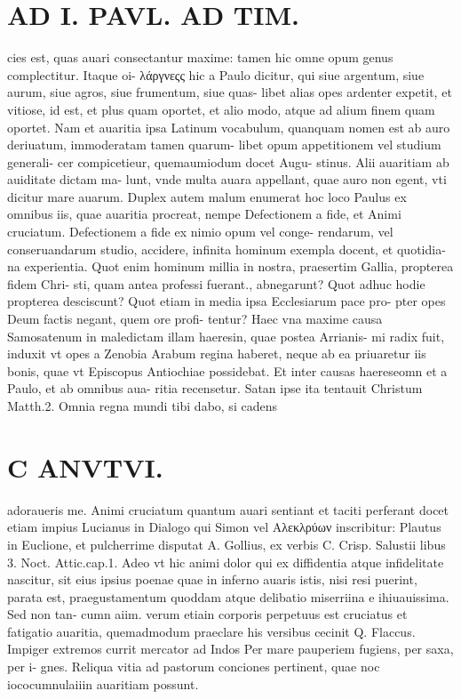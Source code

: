 \documentclass{article}
\begin{document}
\begin{pages}
\section*{AD I. PAVL. AD TIM. }
\marginpar{[ p.40 ]}\pstart cies est, quas auari consectantur maxime: tamen hic omne opum genus complectitur. Itaque oi- λάργνεςς hic a Paulo dicitur, qui siue argentum, siue aurum, siue agros, siue frumentum, siue quas- libet alias opes ardenter expetit, et vitiose, id est, et plus quam oportet, et alio modo, atque ad alium finem quam oportet. Nam et auaritia ipsa Latinum vocabulum, quanquam nomen est ab auro deriuatum, immoderatam tamen quarum- libet opum appetitionem vel studium generali- cer compicetieur, quemaumiodum docet Augu- stinus. Alii auaritiam ab auiditate dictam ma- lunt, vnde multa auara appellant, quae auro non egent, vti dicitur mare auarum.  \pend\pstart Duplex autem malum enumerat hoc loco Paulus ex omnibus iis, quae auaritia procreat, nempe Defectionem a fide, et Animi cruciatum. Defectionem a fide ex nimio opum vel conge- rendarum, vel conseruandarum studio, accidere, infinita hominum exempla docent, et quotidia- na experientia. Quot enim hominum millia in nostra, praesertim Gallia, propterea fidem Chri- sti, quam antea professi fuerant., abnegarunt? Quot adhuc hodie propterea desciscunt?  \pend\pstart Quot etiam in media ipsa Ecclesiarum pace pro- pter opes Deum factis negant, quem ore profi- tentur? Haec vna maxime causa Samosatenum in maledictam illam haeresin, quae postea Arrianis- mi radix fuit, induxit vt opes a Zenobia Arabum regina haberet, neque ab ea priuaretur iis bonis, quae vt Episcopus Antiochiae possidebat. Et inter causas haereseomn et a Paulo, et ab omnibus aua- ritia recensetur. Satan ipse ita tentauit Christum Matth.2. Omnia regna mundi tibi dabo, si cadens  \pend
\section*{C ANVTVI. }
\marginpar{[ p.457 ]}\pstart adoraueris me. Animi cruciatum quantum auari sentiant et taciti perferant docet etiam impius Lucianus in Dialogo qui Simon vel Αλεκλρύων inscribitur: Plautus in Euclione, et pulcherrime disputat A. Gollius, ex verbis C. Crisp. Salustii libus 3. Noct. Attic.cap.1. Adeo vt hic animi dolor qui ex diffidentia atque  infidelitate nascitur, sit eius ipsius poenae quae in inferno auaris istis, nisi resi puerint, parata est, praegustamentum quoddam atque  delibatio miserriina e ihiuauissima. Sed non tan- cumn aiim. verum etiain corporis perpetuus est cruciatus et fatigatio auaritia, quemadmodum praeclare his versibus cecinit Q. Flaccus.  \pend\pstart Impiger extremos currit mercator ad Indos  \pend\pstart Per mare pauperiem fugiens, per saxa, per i- gnes.  \pend\pstart Reliqua vitia ad pastorum conciones pertinent, quae noc iococumnulaiiin auaritiam possunt.  \pend
{}
{}

\end{pages}
\end{document}
